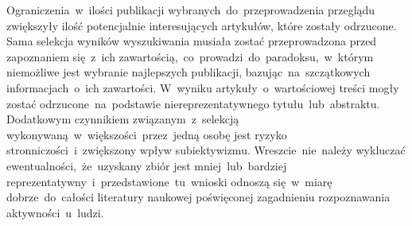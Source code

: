 Ograniczenia~w~ilości publikacji wybranych~do~przeprowadzenia przeglądu zwiększyły ilość potencjalnie interesujących artykułów, które zostały odrzucone. Sama selekcja wyników wyszukiwania musiała zostać przeprowadzona przed zapoznaniem się~z~ich zawartością,~co~prowadzi~do~paradoksu,~w~którym niemożliwe jest wybranie najlepszych publikacji, bazując~na~szczątkowych informacjach~o~ich zawartości. W~wyniku artykuły~o~wartościowej treści mogły zostać odrzucone~na~podstawie niereprezentatywnego tytułu~lub~abstraktu. Dodatkowym czynnikiem związanym~z~selekcją wykonywaną~w~większości~przez~jedną osobę jest ryzyko stronniczości~i~zwiększony wpływ subiektywizmu. Wreszcie~nie~należy wykluczać ewentualności,~że~uzyskany zbiór jest mniej~lub~bardziej reprezentatywny~i~przedstawione~tu~wnioski odnoszą się~w~miarę dobrze~do~całości literatury naukowej poświęconej zagadnieniu rozpoznawania aktywności~u~ludzi.
